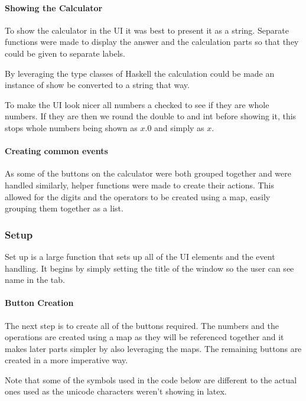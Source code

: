 \documentclass[a4paper]{article}
\begin{document}
\paragraph{Showing the Calculator}
To show the calculator in the UI it was best to present it as a string.
Separate functions were made to display the answer and the calculation parts so that they could be given to separate labels.
\par
By leveraging the type classes of Haskell the calculation could be made an instance of show be converted to a string that way.
\par
To make the UI look nicer all numbers a checked to see if they are whole numbers.
If they are then we round the double to and int before showing it, this stops whole numbers being shown as \( x.0\) and simply as \( x\).


\paragraph{Creating common events}
As some of the buttons on the calculator were both grouped together and were handled similarly, helper functions were made to create their actions.
This allowed for the digits and the operators to be created using a map, easily grouping them together as a list.


\subsubsection{Setup}
Set up is a large function that sets up all of the UI elements and the event handling.
It begins by simply setting the title of the window so the user can see name in the tab.


\paragraph{Button Creation}
The next step is to create all of the buttons required.
The numbers and the operations are created using a map as they will be referenced together and it makes later parts simpler by also leveraging the maps.
The remaining buttons are created in a more imperative way.
\par
Note that some of the symbols used in the code below are different to the actual ones used as the unicode characters weren't showing in latex.

\end{document}
